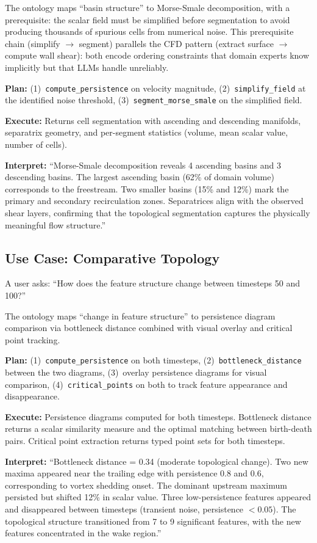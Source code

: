 \documentclass{vgtc}                          %
\begin{document}
The ontology maps ``basin structure'' to Morse-Smale decomposition, with a
prerequisite: the scalar field must be simplified before segmentation to avoid
producing thousands of spurious cells from numerical noise.
This prerequisite chain (simplify $\rightarrow$ segment) parallels the CFD
pattern (extract surface $\rightarrow$ compute wall shear): both encode ordering
constraints that domain experts know implicitly but that LLMs handle unreliably.

\textbf{Plan:} (1)~\texttt{compute\_persistence} on velocity magnitude,
(2)~\texttt{simplify\_field} at the identified noise threshold,
(3)~\texttt{segment\_morse\_smale} on the simplified field.

\textbf{Execute:} Returns cell segmentation with ascending and descending
manifolds, separatrix geometry, and per-segment statistics (volume, mean scalar
value, number of cells).

\textbf{Interpret:} ``Morse-Smale decomposition reveals 4 ascending basins and
3 descending basins.
The largest ascending basin (62\% of domain volume) corresponds to the
freestream.
Two smaller basins (15\% and 12\%) mark the primary and secondary recirculation
zones.
Separatrices align with the observed shear layers, confirming that the
topological segmentation captures the physically meaningful flow structure.''

\subsection{Use Case: Comparative Topology}

A user asks: ``How does the feature structure change between timesteps 50 and
100?''

The ontology maps ``change in feature structure'' to persistence diagram
comparison via bottleneck distance combined with visual overlay and critical
point tracking.

\textbf{Plan:} (1)~\texttt{compute\_persistence} on both timesteps,
(2)~\texttt{bottleneck\_distance} between the two diagrams,
(3)~overlay persistence diagrams for visual comparison,
(4)~\texttt{critical\_points} on both to track feature appearance and
disappearance.

\textbf{Execute:} Persistence diagrams computed for both timesteps.
Bottleneck distance returns a scalar similarity measure and the optimal matching
between birth-death pairs.
Critical point extraction returns typed point sets for both timesteps.

\textbf{Interpret:} ``Bottleneck distance = 0.34 (moderate topological change).
Two new maxima appeared near the trailing edge with persistence 0.8 and 0.6,
corresponding to vortex shedding onset.
The dominant upstream maximum persisted but shifted 12\% in scalar value.
Three low-persistence features appeared and disappeared between timesteps
(transient noise, persistence $< 0.05$).
The topological structure transitioned from 7 to 9 significant features, with
the new features concentrated in the wake region.''
\end{document}
